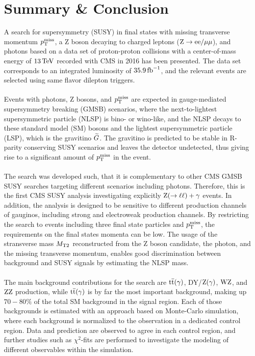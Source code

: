 \chapter{Summary \& Conclusion}\label{chap:conclusion}

A search for supersymmetry (SUSY) in final states with missing transverse momentum $p_{\mathrm{T}}^\text{miss}$, a Z boson decaying to charged leptons ($\mathrm{Z}\to\mathrm{e}\mathrm{e}/{\mu}\mu$), and photons based on a data set of proton-proton collisions with a center-of-mass energy of $13\,\text{Te\hspace{-.08em}V}$ recorded with CMS in 2016 has been presented. The data set corresponds to an integrated luminosity of $35.9\mbox{\ensuremath{\,\text{fb}^\text{$-$1}}}$, and the relevant events are selected using same flavor dilepton triggers.\\\\
Events with photons, Z bosons, and $p_{\mathrm{T}}^\text{miss}$ are expected in gauge-mediated supersymmetry breaking (GMSB) scenarios, where the next-to-lightest supersymmetric particle (NLSP) is bino- or wino-like, and the NLSP decays to these standard model (SM) bosons and the lightest supersymmetric particle (LSP), which is the gravitino $\widetilde{G}$. The gravitino is predicted to be stable in R-parity conserving SUSY scenarios and leaves the detector undetected, thus giving rise to a significant amount of $p_{\mathrm{T}}^\text{miss}$ in the event.\\\\
The search was developed such, that it is complementary to other CMS GMSB SUSY searches targeting different scenarios including photons. Therefore, this is the first CMS SUSY analysis investigating explicitly $\mathrm{Z}(\to\ell\ell)+\gamma$ events. In addition, the analysis is designed to be sensitive to different production channels of gauginos, including strong and electroweak production channels. By restricting the search to events including three final state particles and $p_{\mathrm{T}}^\text{miss}$, the requirements on the final states momenta can be low. The usage of the stransverse mass $M_{\mathrm{T2}}$ reconstructed from the Z boson candidate, the photon, and the missing transverse momentum, enables good discrimination between background and SUSY signals by estimating the NLSP mass.\\\\
The main background contributions for the search are ${\mathrm{t}\overline{\mathrm{t}}}(\gamma)$, DY/$\mathrm{Z}(\gamma)$, $\mathrm{W}\mathrm{Z}$, and $\mathrm{Z}\mathrm{Z}$ production, while ${\mathrm{t}\overline{\mathrm{t}}}(\gamma)$ is by far the most important background, making up $70-80\%$ of the total SM background in the signal region. Each of those backgrounds is estimated with an approach based on Monte-Carlo simulation, where each background is normalized to the observation in a dedicated control region. Data and prediction are observed to agree in each control region, and further studies such as $\chi^2$-fits are performed to investigate the modeling of different observables within the simulation.\\
